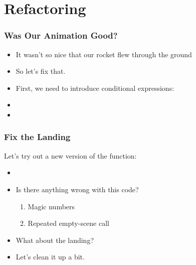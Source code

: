 \documentclass{beamer}
\begin{document}


\section{Refactoring}
\begin{frame}
  \frametitle{Was Our Animation Good?}
  \begin{itemize}
  \item<1-> It wasn't so nice that our rocket flew through the ground
  \item<2-> So let's fix that.
  \item<3-> First, we need to introduce conditional expressions:
  \item<4-> \sign
  \item<5-> \signJava
  \end{itemize}
\end{frame}


\begin{frame}
  \frametitle{Fix the Landing}
  Let's try out a new version of the function:
  \begin{itemize}
  \item<2-> \versionTwo
  \item<3-> Is there anything wrong with this code?
    \begin{enumerate}
    \item<4-> Magic numbers
    \item<5-> Repeated empty-scene call
    \end{enumerate}
  \item<6-> What about the landing?
  \item<7-> Let's clean it up a bit.
  \end{itemize}
\end{frame}
\end{document}
